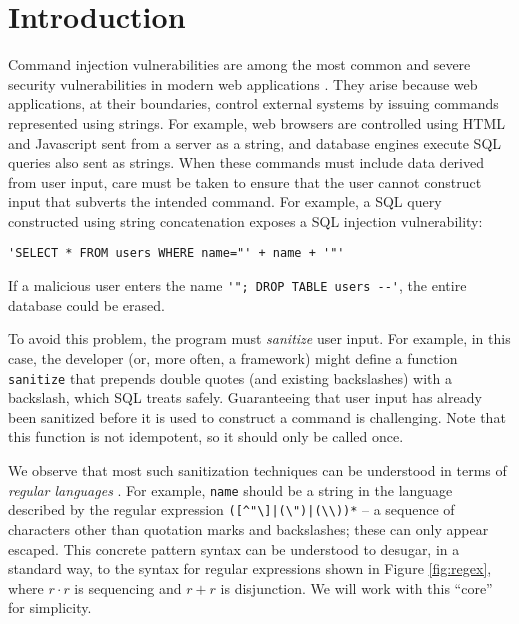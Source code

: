 \documentclass[9pt]{sig-alternate}
\theoremstyle{definition}
\begin{document}
\section{Introduction}\label{intro}
Command injection vulnerabilities are among the most common and severe security vulnerabilities in modern web applications \cite{OWASP}. They arise because web applications, at their boundaries, control external systems by issuing  commands represented using  strings. For example, web browsers are controlled using HTML and Javascript sent from a server as a string, and database engines execute SQL queries also sent as strings. When these commands must include data derived from user input, care must be taken to ensure that the user cannot construct input that subverts the intended command. For example, a  SQL query constructed using string concatenation exposes a SQL injection vulnerability: 
\begin{lstlisting}[numbers=none]
'SELECT * FROM users WHERE name="' + name + '"'
\end{lstlisting}
If a malicious user enters the name \lstinline{'"; DROP TABLE users --'}, the entire database could be erased. 

To avoid this problem, the program must \emph{sanitize} user input. For example, in this case, the developer (or, more often, a framework) might define a function \verb|sanitize| that prepends double quotes (and existing backslashes)  with a backslash, which SQL treats safely. Guaranteeing that user input has already been sanitized before it is used to construct a command is challenging. Note that this function is not idempotent, so it should only be called once.

We observe that most such sanitization techniques can be understood in terms of \emph{regular languages} \cite{cinderella}. For example, \verb|name| should be a string in the language described by the regular expression \verb!([^"\]|(\")|(\\))*! -- a sequence of characters other than quotation marks and backslashes; these can only appear escaped. This concrete pattern syntax can be understood to desugar, in a standard way, to the syntax for regular expressions shown in Figure \ref{fig:regex}, where $r \cdot r$ is sequencing and $r + r$ is  disjunction. We will work with this ``core'' for simplicity.
\end{document}
